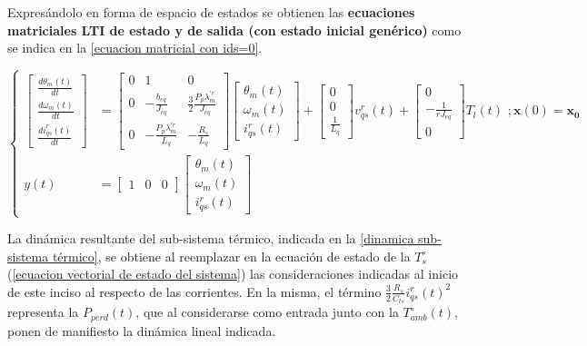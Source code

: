 \documentclass[a4paper, 10pt, onecolumn,journal]{ieeeconf}
\begin{document}
Expresándolo en forma de espacio de estados se obtienen las
\textbf{ecuaciones matriciales LTI de estado y de salida (con estado inicial genérico)}
como se indica en la \cref{ecuacion matricial con ids=0}.

\begin{equation}
	\begin{cases}
		\begin{bmatrix}
			\frac{d \theta_m(t)}{dt} \\ 
			\frac{d \omega_m(t)}{dt}\\
			\frac{d i^r_{qs}(t)}{dt}  
		\end{bmatrix}
		 &= 
		 \begin{bmatrix}
		 	0 & 1 & 0 \\ 
		 	0 & - \frac{b_{eq}}{J_{eq}} & \frac{3}{2} \frac{P_p \lambda^{'r}_m}{J_{eq}} \\
		 	0 &  - \frac{P_p  \lambda^{'r}_m}{L_q} & -\frac{R_s}{L_q}
		 \end{bmatrix}
		 \begin{bmatrix}
		 	{\theta}_m(t) \\ 
		 	{\omega}_m(t)\\
		 	{i}^r_{qs}(t)  
		 \end{bmatrix}
		 +
		 \begin{bmatrix}
		 	0 \\ 
		 	0\\
		 	\frac{1}{L_q}  
		 \end{bmatrix}
		 v^r_{qs}(t)+
		 \begin{bmatrix}
		 	0 \\ 
		 	- \frac{1}{r J_{eq}}\\
		 	0 
		 \end{bmatrix} T_l(t)\,\,; \mathbf{x}(0) = \mathbf{x_0}\\
		 y(t) &= \begin{bmatrix}
		 		1 & 0 & 0
		 	 \end{bmatrix}
		 	 \begin{bmatrix}
		 	 	{\theta}_m(t) \\ 
		 	 	{\omega}_m(t)\\
		 	 	{i}^r_{qs}(t)
		 	 \end{bmatrix}
	\end{cases}
	\label{ecuacion matricial con ids=0}
\end{equation}

La dinámica resultante del sub-sistema térmico,
indicada en la \cref{dinamica sub-sistema térmico},
se obtiene al reemplazar en la ecuación de estado de la $T^{\circ}_s$
(\cref{ecuacion vectorial de estado del sistema}) las consideraciones indicadas al inicio de este inciso al
respecto de las corrientes. En la misma, el término $\frac{3}{2}\frac{R_{s}}{C_{ts}} {i^r_{qs}(t)}^2$ representa
la $P_{perd}(t)$, que al considerarse como entrada junto con la $T^{\circ}_{amb}(t)$, ponen de
manifiesto la dinámica lineal indicada.
\end{document}
